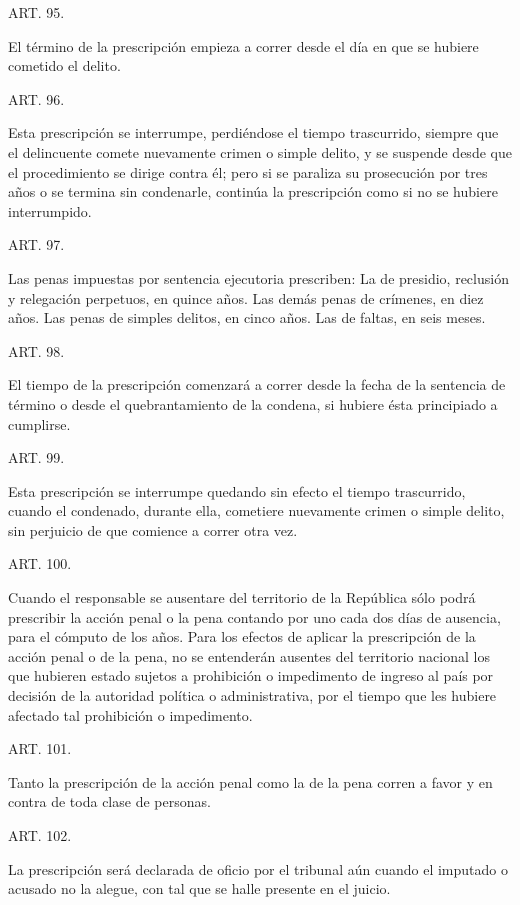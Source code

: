     ART. 95.

    El término de la prescripción empieza a correr desde el día en que se hubiere cometido el delito.



    ART. 96.
   
    Esta prescripción se interrumpe, perdiéndose el tiempo trascurrido, siempre que el delincuente comete nuevamente crimen o simple delito, y se suspende desde que el procedimiento se dirige contra él; pero si se paraliza su prosecución por tres años o se termina sin condenarle, continúa la prescripción como si no se hubiere interrumpido.


    ART. 97.

    Las penas impuestas por sentencia ejecutoria prescriben:
    La de presidio, reclusión y relegación perpetuos, en quince años.
    Las demás penas de crímenes, en diez años.
    Las penas de simples delitos, en cinco años.
    Las de faltas, en seis meses.




    ART. 98.

    El tiempo de la prescripción comenzará a correr desde la fecha de la sentencia de término o desde el quebrantamiento de la condena, si hubiere ésta principiado a cumplirse.


    ART. 99.

    Esta prescripción se interrumpe quedando sin efecto el tiempo trascurrido, cuando el condenado, durante ella, cometiere nuevamente crimen o simple delito, sin perjuicio de que comience a correr otra vez.



    ART. 100.

    Cuando el responsable se ausentare del territorio de la República sólo podrá prescribir la acción penal o la pena contando por uno cada dos días de ausencia, para el cómputo de los años.
    Para los efectos de aplicar la prescripción de la acción penal o de la pena, no se entenderán ausentes del territorio nacional los que hubieren estado sujetos a prohibición o impedimento de ingreso al país por decisión de la autoridad política o administrativa, por el tiempo que les hubiere afectado tal prohibición o impedimento.


    ART. 101.

    Tanto la prescripción de la acción penal como la de la pena corren a favor y en contra de toda clase de personas.


    ART. 102.

    La prescripción será declarada de oficio por el tribunal aún cuando el imputado o acusado no la alegue, con tal que se halle presente en el juicio.


